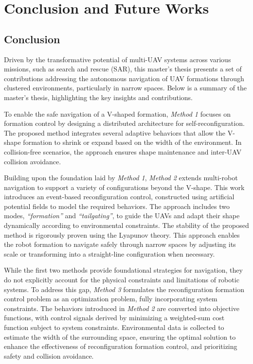 \chapter{Conclusion and Future Works}\label{conclusion}

\section{Conclusion}
Driven by the transformative potential of multi-UAV systems across various missions, such as search and rescue (SAR), this master's thesis presents a set of contributions addressing the autonomous navigation of UAV formations through clustered environments, particularly in narrow spaces. Below is a summary of the master's thesis, highlighting the key insights and contributions.

To enable the safe navigation of a V-shaped formation, \textit{Method 1} focuses on formation control by designing a distributed architecture for self-reconfiguration. The proposed method integrates several adaptive behaviors that allow the V-shape formation to shrink or expand based on the width of the environment. In collision-free scenarios, the approach ensures shape maintenance and inter-UAV collision avoidance.

Building upon the foundation laid by \textit{Method 1}, \textit{Method 2} extends multi-robot navigation to support a variety of configurations beyond the V-shape. This work introduces an event-based reconfiguration control, constructed using artificial potential fields to model the required behaviors. The approach includes two modes, \textit{``formation''} and \textit{``tailgating''}, to guide the UAVs and adapt their shape dynamically according to environmental constraints. The stability of the proposed method is rigorously proven using the Lyapunov theory. This approach enables the robot formation to navigate safely through narrow spaces by adjusting its scale or transforming into a straight-line configuration when necessary.

While the first two methods provide foundational strategies for navigation, they do not explicitly account for the physical constraints and limitations of robotic systems. To address this gap, \textit{Method 3} formulates the reconfiguration formation control problem as an optimization problem, fully incorporating system constraints. The behaviors introduced in \textit{Method 2} are converted into objective functions, with control signals derived by minimizing a weighted-sum cost function subject to system constraints. Environmental data is collected to estimate the width of the surrounding space, ensuring the optimal solution to enhance the effectiveness of reconfiguration formation control, and prioritizing safety and collision avoidance.

